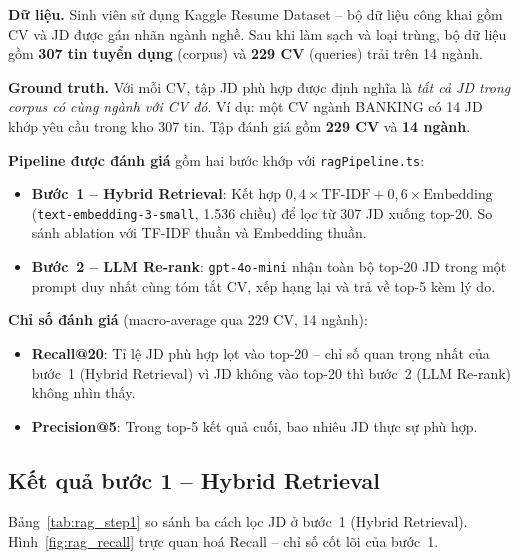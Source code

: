 \documentclass[../DoAn.tex]{subfiles}
\begin{document}
\textbf{Dữ liệu.} Sinh viên sử dụng Kaggle Resume Dataset -- bộ dữ liệu công khai gồm CV và JD được gán nhãn ngành nghề. Sau khi làm sạch và loại trùng, bộ dữ liệu gồm \textbf{307 tin tuyển dụng} (corpus) và \textbf{229 CV} (queries) trải trên 14 ngành.

\textbf{Ground truth.} Với mỗi CV, tập JD phù hợp được định nghĩa là \textit{tất cả JD trong corpus có cùng ngành với CV đó}. Ví dụ: một CV ngành BANKING có 14 JD khớp yêu cầu trong kho 307 tin. Tập đánh giá gồm \textbf{229 CV} và \textbf{14 ngành}.

\textbf{Pipeline được đánh giá} gồm hai bước khớp với \texttt{ragPipeline.ts}:
\begin{itemize}
  \item \textbf{Bước~1 -- Hybrid Retrieval}: Kết hợp $0{,}4 \times \text{TF-IDF} + 0{,}6 \times \text{Embedding}$ (\texttt{text-em\-bed\-ding-3-small}, 1.536 chiều) để lọc từ 307 JD xuống top-20. So sánh ablation với TF-IDF thuần và Embedding thuần.
  \item \textbf{Bước~2 -- LLM Re-rank}: \texttt{gpt-4o-mini} nhận toàn bộ top-20 JD trong một prompt duy nhất cùng tóm tắt CV, xếp hạng lại và trả về top-5 kèm lý do.
\end{itemize}

\textbf{Chỉ số đánh giá} (macro-average qua 229 CV, 14 ngành):
\begin{itemize}
  \item \textbf{Recall@20}: Tỉ lệ JD phù hợp lọt vào top-20 -- chỉ số quan trọng nhất của bước~1 (Hybrid Retrieval) vì JD không vào top-20 thì bước~2 (LLM Re-rank) không nhìn thấy.
  \item \textbf{Precision@5}: Trong top-5 kết quả cuối, bao nhiêu JD thực sự phù hợp.
\end{itemize}

\subsection{Kết quả bước 1 -- Hybrid Retrieval}
\label{sec:exp_step1}

Bảng~\ref{tab:rag_step1} so sánh ba cách lọc JD ở bước~1 (Hybrid Retrieval). Hình~\ref{fig:rag_recall} trực quan hoá Recall -- chỉ số cốt lõi của bước~1.

\begin{table}[H]
\centering
\caption{So sánh ba cách lọc JD ở bước~1 trên 229 CV, 14 ngành, corpus 307 JD}
\label{tab:rag_step1}
\end{table}
\end{document}
